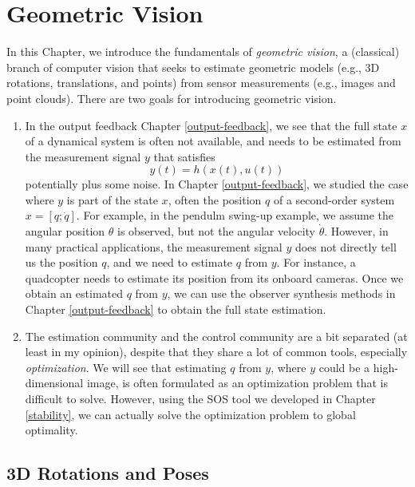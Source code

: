 \documentclass[
]{book}
\theoremstyle{definition}
\theoremstyle{definition}
\theoremstyle{definition}
\theoremstyle{definition}
\theoremstyle{remark}
\begin{document}
\hypertarget{geometric-vision}{%
\chapter{Geometric Vision}\label{geometric-vision}}

In this Chapter, we introduce the fundamentals of \emph{geometric vision}, a (classical) branch of computer vision that seeks to estimate geometric models (e.g., 3D rotations, translations, and points) from sensor measurements (e.g., images and point clouds). There are two goals for introducing geometric vision.

\begin{enumerate}
\def\labelenumi{\arabic{enumi}.}
\item
  In the output feedback Chapter \ref{output-feedback}, we see that the full state \(x\) of a dynamical system is often not available, and needs to be estimated from the measurement signal \(y\) that satisfies
  \[
  y(t) = h(x(t),u(t))
  \]
  potentially plus some noise. In Chapter \ref{output-feedback}, we studied the case where \(y\) is part of the state \(x\), often the position \(q\) of a second-order system \(x=[q;\dot{q}]\). For example, in the pendulm swing-up example, we assume the angular position \(\theta\) is observed, but not the angular velocity \(\dot{\theta}\). However, in many practical applications, the measurement signal \(y\) does not directly tell us the position \(q\), and we need to estimate \(q\) from \(y\). For instance, a quadcopter needs to estimate its position from its onboard cameras. Once we obtain an estimated \(q\) from \(y\), we can use the observer synthesis methods in Chapter \ref{output-feedback} to obtain the full state estimation.
\item
  The estimation community and the control community are a bit separated (at least in my opinion), despite that they share a lot of common tools, especially \emph{optimization}. We will see that estimating \(q\) from \(y\), where \(y\) could be a high-dimensional image, is often formulated as an optimization problem that is difficult to solve. However, using the SOS tool we developed in Chapter \ref{stability}, we can actually solve the optimization problem to global optimality.
\end{enumerate}

\hypertarget{d-rotations-and-poses}{%
\section{3D Rotations and Poses}\label{d-rotations-and-poses}}
\end{document}
